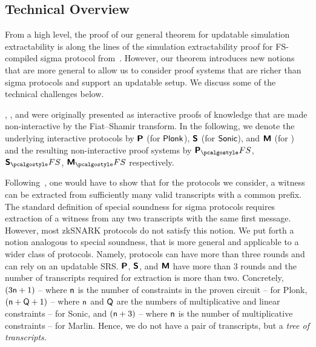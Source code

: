 \subsection{Technical Overview}

From a high level, the proof of our general theorem for updatable simulation
extractability is along the lines of the simulation extractability proof for
FS-compiled sigma protocol from~\cite{INDOCRYPT:FKMV12}. However, our theorem
introduces new notions that are more general to allow us to consider proof
systems that are richer than sigma protocols and support an updatable setup. We
discuss some of the technical challenges below.

\plonk{}, \sonic{}, and \marlin{} were originally presented as interactive
proofs of knowledge that are made non-interactive by the Fiat--Shamir transform.
In the following, we denote the underlying interactive protocols by $\bm{\mathsf{P}}$
(for $\textnormal{\textsf{Plonk}}$), $\bm{\mathsf{S}}$ (for ${\textnormal{\textsf{Sonic}}}$), and $\bm{\mathsf{M}}$ (for \marlin) and
the resulting non-interactive proof systems by $\plonkprotfs$, $\sonicprotfs$,
$\marlinprotfs$ respectively.

Following~\cite{INDOCRYPT:FKMV12}, one would have to show that for the protocols
we consider, a witness can be extracted from sufficiently many valid transcripts
with a common prefix. The standard definition of special soundness for sigma
protocols requires extraction of a witness from any two transcripts with the
same first message. However, most zkSNARK protocols do not satisfy this notion.
We put forth a notion analogous to special soundness, that is more general and
applicable to a wider class of protocols. Namely, protocols can have more than three
rounds and can rely on an updatable SRS. $\bm{\mathsf{P}}$, $\bm{\mathsf{S}}$, and
$\bm{\mathsf{M}}$ have more than 3 rounds and the number of transcripts required for extraction is more
than two. Concretely, $(3 \mathsf{n} + 1)$ -- where $\mathsf{n}$ is the number of
constraints in the proven circuit -- for Plonk, $(\mathsf{n} + \mathsf{Q} + 1)$
-- where $\mathsf{n}$ and $\mathsf{Q}$ are the numbers of multiplicative and
linear constraints -- for Sonic, and $(\mathsf{n} + 3)$ -- where $\mathsf{n}$
is the number of multiplicative constraints -- for Marlin. Hence, we do not have
a pair of transcripts, but a \emph{tree of transcripts}.


